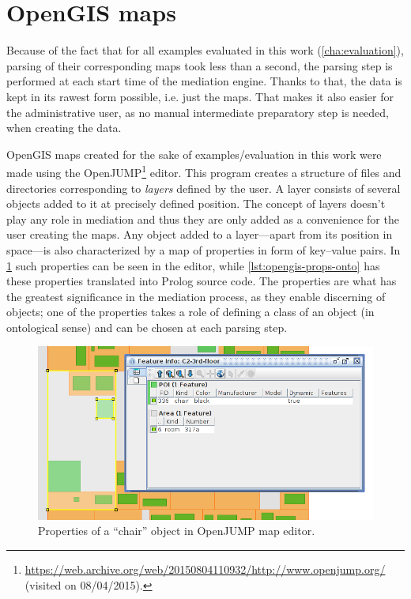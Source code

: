 \section{OpenGIS maps}

Because of the fact that for all examples evaluated in this work (\cref{cha:evaluation}), parsing of their corresponding maps took less than a second, the parsing step is performed at each start time of the mediation engine. Thanks to that, the data is kept in its rawest form possible, i.e. just the maps. That makes it also easier for the administrative user, as no manual intermediate preparatory step is needed, when creating the data.

OpenGIS maps created for the sake of examples/evaluation in this work were made using the OpenJUMP\footnote{\url{https://web.archive.org/web/20150804110932/http://www.openjump.org/} (visited on 08/04/2015).} editor. This program creates a structure of files and directories corresponding to \emph{layers} defined by the user. A layer consists of several objects added to it at precisely defined position. The concept of layers doesn't play any role in mediation and thus they are only added as a convenience for the user creating the maps. Any object added to a layer---apart from its position in space---is also characterized by a map of properties in form of key--value pairs. In \cref{fig:opengis-props-map} such properties can be seen in the editor, while \cref{lst:opengis-props-onto} has these properties translated into Prolog source code. The properties are what has the greatest significance in the mediation process, as they enable discerning of objects; one of the properties takes a role of defining a class of an object (in ontological sense) and can be chosen at each parsing step.

\begin{figure}
	\centering
	\includegraphics[width=\textwidth]{opengis-props-map}
	\caption{Properties of a ``chair'' object in OpenJUMP map editor.}
	\label{fig:opengis-props-map}
\end{figure}

